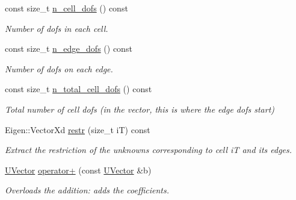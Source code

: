 \begin{DoxyCompactItemize}
\mbox{\label{classHArDCore2D_1_1UVector_a7a60116ab5a3e30a4bfdae0f59b0b56a}} 
const size\+\_\+t \hyperlink{classHArDCore2D_1_1UVector_a7a60116ab5a3e30a4bfdae0f59b0b56a}{n\+\_\+cell\+\_\+dofs} () const
\begin{DoxyCompactList}\small\item\em Number of dofs in each cell. \end{DoxyCompactList}\item 
\mbox{\label{classHArDCore2D_1_1UVector_ad9c8979d99d1b65198460b9e2cd0e46a}} 
const size\+\_\+t \hyperlink{classHArDCore2D_1_1UVector_ad9c8979d99d1b65198460b9e2cd0e46a}{n\+\_\+edge\+\_\+dofs} () const
\begin{DoxyCompactList}\small\item\em Number of dofs on each edge. \end{DoxyCompactList}\item 
\mbox{\label{classHArDCore2D_1_1UVector_a351f3c7fa4646c35964f1e42d26adb6f}} 
const size\+\_\+t \hyperlink{classHArDCore2D_1_1UVector_a351f3c7fa4646c35964f1e42d26adb6f}{n\+\_\+total\+\_\+cell\+\_\+dofs} () const
\begin{DoxyCompactList}\small\item\em Total number of cell dofs (in the vector, this is where the edge dofs start) \end{DoxyCompactList}\item 
\mbox{\label{classHArDCore2D_1_1UVector_a24a0a68f8f1e8bdc4845bee48b7ce8d2}} 
Eigen\+::\+Vector\+Xd \hyperlink{classHArDCore2D_1_1UVector_a24a0a68f8f1e8bdc4845bee48b7ce8d2}{restr} (size\+\_\+t iT) const
\begin{DoxyCompactList}\small\item\em Extract the restriction of the unknowns corresponding to cell iT and its edges. \end{DoxyCompactList}\item 
\mbox{\label{classHArDCore2D_1_1UVector_a4e485116ef8d2bbdbdffaab1b3377ba5}} 
\hyperlink{classHArDCore2D_1_1UVector}{U\+Vector} \hyperlink{classHArDCore2D_1_1UVector_a4e485116ef8d2bbdbdffaab1b3377ba5}{operator+} (const \hyperlink{classHArDCore2D_1_1UVector}{U\+Vector} \&b)
\begin{DoxyCompactList}\small\item\em Overloads the addition\+: adds the coefficients. \end{DoxyCompactList}\item 

\end{DoxyCompactItemize}
